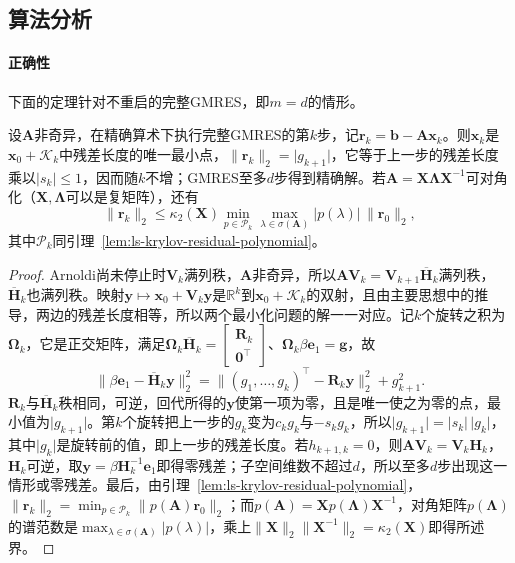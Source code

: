 \subsection{算法分析}

\paragraph{正确性}
下面的定理针对不重启的完整GMRES，即$m=d$的情形。

\begin{theorem}[GMRES的最小残差性]
\label{thm:ls-gmres-optimality}
设$\bm A$非奇异，在精确算术下执行完整GMRES的第$k$步，记$\bm r_k=\bm b-\bm A\bm x_k$。则$\bm x_k$是$\bm x_0+\mathcal K_k$中残差长度的唯一最小点，$\lVert\bm r_k\rVert_2=\lvert g_{k+1}\rvert$，它等于上一步的残差长度乘以$\lvert s_k\rvert\le1$，因而随$k$不增；GMRES至多$d$步得到精确解。若$\bm A=\bm X\bm\Lambda\bm X^{-1}$可对角化（$\bm X,\bm\Lambda$可以是复矩阵），还有
\[
 \lVert\bm r_k\rVert_2\le\kappa_2(\bm X)\min_{p\in\mathcal P_k}\max_{\lambda\in\sigma(\bm A)}\lvert p(\lambda)\rvert\,\lVert\bm r_0\rVert_2,
\]
其中$\mathcal P_k$同引理~\ref{lem:ls-krylov-residual-polynomial}。
\end{theorem}

\begin{proof}
Arnoldi尚未停止时$\bm V_k$满列秩，$\bm A$非奇异，所以$\bm A\bm V_k=\bm V_{k+1}\overline{\bm H}_k$满列秩，$\overline{\bm H}_k$也满列秩。映射$\bm y\mapsto\bm x_0+\bm V_k\bm y$是$\mathbb R^k$到$\bm x_0+\mathcal K_k$的双射，且由主要思想中的推导，两边的残差长度相等，所以两个最小化问题的解一一对应。记$k$个旋转之积为$\bm\Omega_k$，它是正交矩阵，满足$\bm\Omega_k\overline{\bm H}_k=\begin{bmatrix}\bm R_k\\\bm 0^\top\end{bmatrix}$、$\bm\Omega_k\beta\bm e_1=\bm g$，故
\[
 \lVert\beta\bm e_1-\overline{\bm H}_k\bm y\rVert_2^2
 =\lVert(g_1,\ldots,g_k)^\top-\bm R_k\bm y\rVert_2^2+g_{k+1}^2 .
\]
$\bm R_k$与$\overline{\bm H}_k$秩相同，可逆，回代所得的$\bm y$使第一项为零，且是唯一使之为零的点，最小值为$\lvert g_{k+1}\rvert$。第$k$个旋转把上一步的$g_k$变为$c_kg_k$与$-s_kg_k$，所以$\lvert g_{k+1}\rvert=\lvert s_k\rvert\,\lvert g_k\rvert$，其中$\lvert g_k\rvert$是旋转前的值，即上一步的残差长度。若$h_{k+1,k}=0$，则$\bm A\bm V_k=\bm V_k\bm H_k$，$\bm H_k$可逆，取$\bm y=\beta\bm H_k^{-1}\bm e_1$即得零残差；子空间维数不超过$d$，所以至多$d$步出现这一情形或零残差。最后，由引理~\ref{lem:ls-krylov-residual-polynomial}，$\lVert\bm r_k\rVert_2=\min_{p\in\mathcal P_k}\lVert p(\bm A)\bm r_0\rVert_2$；而$p(\bm A)=\bm Xp(\bm\Lambda)\bm X^{-1}$，对角矩阵$p(\bm\Lambda)$的谱范数是$\max_{\lambda\in\sigma(\bm A)}\lvert p(\lambda)\rvert$，乘上$\lVert\bm X\rVert_2\lVert\bm X^{-1}\rVert_2=\kappa_2(\bm X)$即得所述界。
\end{proof}

